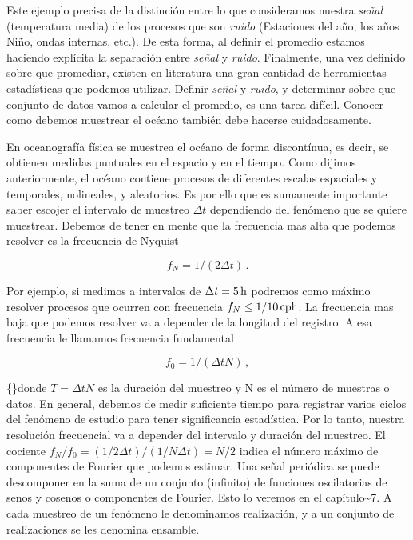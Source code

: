 \documentclass[
]{agujournal2019}
\begin{document}
\begin{itemize}
Este ejemplo precisa de la distinción entre lo que consideramos nuestra {\it señal}
(temperatura media) de los procesos que son {\it ruido} (Estaciones del año, los años Niño,
ondas internas, etc.). De esta forma, al definir el promedio estamos
haciendo explícita la separación entre {\it señal} y {\it ruido}. Finalmente, una vez
definido sobre que promediar, existen en literatura una gran cantidad de herramientas
estadísticas que podemos utilizar. Definir {\it señal} y {\it ruido}, y determinar
sobre que conjunto de datos vamos a calcular el promedio, es una tarea difícil.
Conocer como debemos muestrear el océano también debe hacerse
cuidadosamente.
\\
\end{itemize}

En oceanografía física se muestrea el océano de forma discontínua, es
decir, se obtienen medidas puntuales en el espacio y en el tiempo. Como
dijimos anteriormente, el océano contiene procesos de diferentes escalas
espaciales y temporales, nolineales, y aleatorios. Es por ello que es
sumamente importante saber escojer el intervalo de muestreo
\(\Delta{t}\) dependiendo del fenómeno que se quiere muestrear. Debemos
de tener en mente que la frecuencia mas alta que podemos resolver es la
frecuencia de Nyquist

\[f_N=1/(2\Delta{t})\,.\]

Por ejemplo, si medimos a intervalos de \(\Delta{t}=5\,{\rm h}\)
podremos como máximo resolver procesos que ocurren con frecuencia
\(f_N\le1/10\,{\rm cph}\). La frecuencia mas baja que podemos resolver
va a depender de la longitud del registro. A esa frecuencia le llamamos
frecuencia fundamental

\[f_0=1/(\Delta{t}N)\,,\]

\{\noindent\}donde \(T=\Delta{t} N\) es la duración del muestreo y N es
el número de muestras o datos. En general, debemos de medir suficiente
tiempo para registrar varios ciclos del fenómeno de estudio para tener
significancia estadística. Por lo tanto, nuestra resolución frecuencial
va a depender del intervalo y duración del muestreo. El cociente
\(f_N/f_0=(1/2\Delta{t})/(1/N\Delta{t})=N/2\) indica el número máximo de
componentes de Fourier que podemos estimar. Una señal periódica se puede
descomponer en la suma de un conjunto (infinito) de funciones
oscilatorias de senos y cosenos o componentes de Fourier. Esto lo
veremos en el capítulo\textasciitilde7. A cada muestreo de un fenómeno
le denominamos realización, y a un conjunto de realizaciones se les
denomina ensamble.
\end{document}
